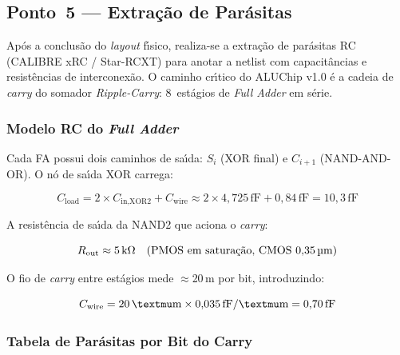 \documentclass[12pt,a4paper]{article}
\begin{document}
\subsection{Ponto~5 --- Extra\c{c}\~{a}o de Par\'{a}sitas}
\label{sec:parasitas}

Ap\'{o}s a conclus\~{a}o do \textit{layout} f\'{\i}sico, realiza-se a extra\c{c}\~{a}o de par\'{a}sitas RC (CALIBRE xRC / Star-RCXT) para anotar a netlist com capacit\^{a}ncias e resist\^{e}ncias de interconex\~{a}o. O caminho cr\'{\i}tico do ALUChip v1.0 \'{e} a cadeia de \textit{carry} do somador \textit{Ripple-Carry}: 8~est\'{a}gios de \textit{Full Adder} em s\'{e}rie.

\subsubsection{Modelo RC do \textit{Full Adder}}

Cada FA possui dois caminhos de sa\'{\i}da: $S_i$ (XOR final) e $C_{i+1}$ (NAND-AND-OR). O n\'{o} de sa\'{\i}da XOR carrega:

\[
  C_{\text{load}} = 2 \times C_{\text{in,XOR2}} + C_{\text{wire}}
                 \approx 2 \times 4{,}725\,\text{fF} + 0{,}84\,\text{fF} = 10{,}3\,\text{fF}
\]

A resist\^{e}ncia de sa\'{\i}da da NAND2 que aciona o \textit{carry}:

\[
  R_{\text{out}} \approx 5\,\text{k}\Omega \quad \text{(PMOS em satura\c{c}\~{a}o, CMOS 0,35\,\textmu m)}
\]

O fio de \textit{carry} entre est\'{a}gios mede $\approx$20\,\textmu m por bit, introduzindo:

\[
  C_{\text{wire}} = 20\,\textmu\text{m} \times 0{,}035\,\text{fF}/\textmu\text{m} = 0{,}70\,\text{fF}
\]

\subsubsection{Tabela de Par\'{a}sitas por Bit do Carry}
\end{document}

